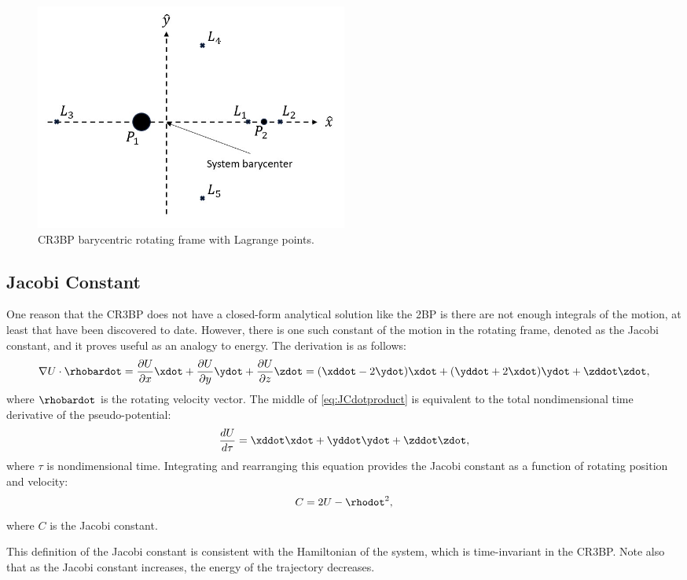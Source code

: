 \begin{figure}[ht]
    \centering
    \includegraphics[width=0.5\textwidth]{figures/RotFrame.jpg}
    \caption{CR3BP barycentric rotating frame with Lagrange points.}
    \label{fig:rotFrame}
\end{figure}

\subsection{Jacobi Constant}
One reason that the CR3BP does not have a closed-form analytical solution like the 2BP is there are
not enough integrals of the motion, at least that have been discovered to date. However, there is
one such constant of the motion in the rotating frame, denoted as the Jacobi constant, and it
proves useful as an analogy to energy. The derivation is as follows\cite{Zimovan:2017}:
\begin{equation}
    \nabla U\cdot\rhobardot=\frac{\partial U}{\partial x}\xdot+\frac{\partial U}{\partial y}\ydot+\frac{\partial U}{\partial z}\zdot=(\xddot-2\ydot)\xdot+(\yddot+2\xdot)\ydot+\zddot\zdot,
    \label{eq:JCdotproduct}
\end{equation}
where $\rhobardot$ is the rotating velocity vector. The middle of \cref{eq:JCdotproduct} is
equivalent to the total nondimensional time derivative of the pseudo-potential:
\begin{equation}
    \frac{dU}{d\tau}=\xddot\xdot+\yddot\ydot+\zddot\zdot,
    \label{eq:JCtimeder}
\end{equation}
where $\tau$ is nondimensional time. Integrating and rearranging this equation provides the Jacobi
constant as a function of rotating position and velocity:
\begin{equation}
    C=2U-\rhodot^{2},
    \label{eq:JC}
\end{equation}
where $C$ is the Jacobi constant.

This definition of the Jacobi constant is consistent with the Hamiltonian of the system, which is
time-invariant in the CR3BP\cite{Boudad:2022}. Note also that as the Jacobi constant increases, the
energy of the trajectory decreases.
